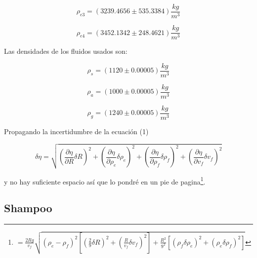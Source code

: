 \documentclass[DIV=calc, paper=a4, fontsize=11pt]{scrartcl}
\begin{document}
\begin{multicols}{2}
\begin{equation*}
    \rho_{e3} = (3239.4656 \pm 535.3384) \frac{kg}{m^3}
\end{equation*}

\begin{equation*}
    \rho_{e4} = (3452.1342 \pm 248.4621) \frac{kg}{m^3}
\end{equation*}

Las densidades de los fluidos usados son:

\begin{equation*}
    \rho_{s}= (1120 \pm 0.00005) \frac{kg}{m^3}
\end{equation*}

\begin{equation*}
    \rho_{a} = (1000 \pm 0.00005) \frac{kg}{m^3}
\end{equation*}

\begin{equation*}
    \rho_{g} = (1240 \pm 0.00005) \frac{kg}{m^3}
\end{equation*}



Propagando la incertidumbre de la ecuación (1)

\begin{equation*}
    \delta \eta = \sqrt{\left(\frac{\partial \eta}{\partial R}\delta R\right)^{2} + \left(\frac{\partial \eta}{\partial  \rho_e} \delta \rho_{e}\right)^{2} + \left(\frac{\partial \eta}{\partial  \rho_f} \delta \rho_f \right)^{2} + \left(\frac{\partial \eta}{\partial  v_f} \delta v_f\right)^{2}}
\end{equation*}

y no hay suficiente espacio así que lo pondré en un pie de pagina\footnote{$= \frac{2R g}{v_f} \sqrt{(\rho_e - \rho_f)^2\left[\left(\frac{2}{9}\delta R\right)^2+\left(\frac{R}{v_f}\delta v_f\right)^2\right] +\frac{R^2}{9^2} \left[\left(\rho_f \delta \rho_e\right)^{2} + \left(\rho_e \delta \rho_f\right)^{2}\right]}$}.



\subsection*{Shampoo}


\end{multicols}
\end{document}
